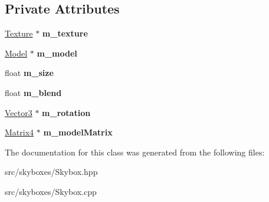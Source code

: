 \subsection*{Private Attributes}
\begin{DoxyCompactItemize}
\item 
\mbox{\label{class_flounder_1_1_skybox_af95b53af022cb5aeecaa0bd0972b8640}} 
\hyperlink{class_flounder_1_1_texture}{Texture} $\ast$ {\bfseries m\+\_\+texture}
\item 
\mbox{\label{class_flounder_1_1_skybox_a4044078cc2547d79ab2d41e1fc5fb3d3}} 
\hyperlink{class_flounder_1_1_model}{Model} $\ast$ {\bfseries m\+\_\+model}
\item 
\mbox{\label{class_flounder_1_1_skybox_a825cd0e33b5f89bca533c1a3971bca2b}} 
float {\bfseries m\+\_\+size}
\item 
\mbox{\label{class_flounder_1_1_skybox_a5fbf613c8299d3d7deecda75682feef8}} 
float {\bfseries m\+\_\+blend}
\item 
\mbox{\label{class_flounder_1_1_skybox_aa8fc22f6b111870cc61511651e46df07}} 
\hyperlink{class_flounder_1_1_vector3}{Vector3} $\ast$ {\bfseries m\+\_\+rotation}
\item 
\mbox{\label{class_flounder_1_1_skybox_ac9818137cd8a30295751334d4234df93}} 
\hyperlink{class_flounder_1_1_matrix4}{Matrix4} $\ast$ {\bfseries m\+\_\+model\+Matrix}
\end{DoxyCompactItemize}


The documentation for this class was generated from the following files\+:\begin{DoxyCompactItemize}
\item 
src/skyboxes/Skybox.\+hpp\item 
src/skyboxes/Skybox.\+cpp\end{DoxyCompactItemize}
